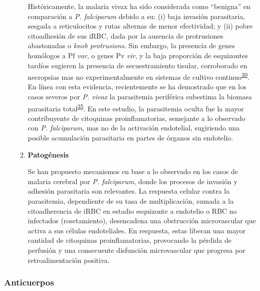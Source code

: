 \documentclass[]{article}
\begin{document}
\begin{enumerate}
\begin{enumerate}
    Históricamente, la malaria vivax ha sido considerada como
    ``benigna'' en comparación a \emph{P. falciparum} debido a su: (i)
    baja invasión parasitaria, sesgada a reticulocitos y rutas alternas
    de menor efectividad; y (ii) pobre citoadhesión de sus iRBC, dada
    por la ausencia de protrusiones abastonadas o \emph{knob
    protrusions}. Sin embargo, la presencia de genes homólogos a Pf
    \emph{var}, o genes Pv \emph{vir}, y la baja proporción de
    esquizontes tardíos sugieren la presencia de secuestramiento
    tisular, corroborado en necropsias mas no experimentalmente en
    sistemas de cultivo
    continuo\textsuperscript{\protect\hyperlink{ref-wassmer2015}{30}}.
    En línea con esta evidencia, recientemente se ha demostrado que en
    los casos severos por \emph{P. vivax} la parasitemia periférica
    subestima la biomasa parasitaria
    total\textsuperscript{\protect\hyperlink{ref-barber2015}{35}}. En
    este estudio, la parasitemia oculta fue la mayor contribuyente de
    citoquinas proinflamatorias, semejante a lo observado con \emph{P.
    falciparum}, mas no de la activación endotelial, sugiriendo una
    posible acumulación parasitaria en partes de órganos sin endotelio.
  \item
    \textbf{Patogénesis}

    Se han propuesto mecanismos en base a lo observado en los casos de
    malaria cerebral por \emph{P. falciparum}, donde los procesos de
    invasión y adhesión parasitaria son relevantes. La respuesta celular
    contra la parasitemia, dependiente de su tasa de multiplicación,
    sumada a la citoadherencia de iRBC en estadio esquizonte a endotelio
    o RBC no infectados (rosetamiento), desencadena una obstrucción
    microvascular que activa a sus células endoteliales. En respuesta,
    estas liberan una mayor cantidad de citoquinas proinflamatorias,
    provocando la pérdida de perfusión y una consecuente disfunción
    microvascular que progresa por retroalimentación positiva.
  \end{enumerate}
\end{enumerate}

\subsubsection{Anticuerpos}\label{anticuerpos}
\end{document}
